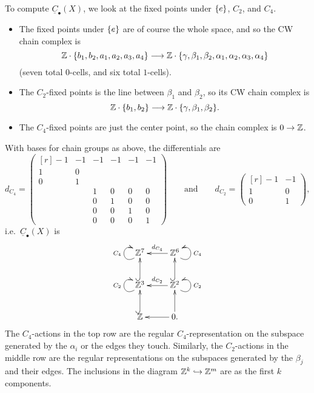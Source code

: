 \begin{exm}
To compute $\underline C_\bullet(X)$, we look at the fixed points under $\{e\}$, $C_2$, and $C_4$.
\begin{itemize}
	\item The fixed points under $\{e\}$ are of course the whole space, and so the CW chain complex is
	\[\mathbb Z\cdot\{b_1,b_2,a_1,a_2,a_3,a_4\}\longrightarrow \mathbb Z\cdot
	\{\gamma,\beta_1,\beta_2,\alpha_1,\alpha_2,\alpha_3,\alpha_4\}\]
	(seven total $0$-cells, and six total $1$-cells).
	\item The $C_2$-fixed points is the line between $\beta_1$ and $\beta_2$, so its CW chain complex is
	\[\mathbb Z\cdot\{b_1,b_2\}\longrightarrow \mathbb Z\cdot\{\gamma, \beta_1,\beta_2\}.\]
	\item The $C_4$-fixed points are just the center point, so the chain complex is $0\to\mathbb Z$.
\end{itemize}
With bases for chain groups as above, the differentials are
\[d_{C_4} = \begin{pmatrix*}[r]
	-1 & -1 & -1 & -1 & -1 & -1\\
	1 & 0\\0 & 1\\
	&& 1 & 0 & 0 & 0\\
	&&0& 1 & 0 & 0\\
	&&0&0& 1 & 0\\
	&&0&0&0& 1
\end{pmatrix*} \qquad\text{and}\qquad
d_{C_2} = \begin{pmatrix*}[r]
	-1 & -1\\
	1 & 0\\0 & 1
\end{pmatrix*},
\]
i.e.\ $\underline C_\bullet(X)$ is
\[\xymatrix{
	\ar@(dl,ul)^{C_4}\Z^7 & \Z^6\ar[l]_{d_{C_4}}\ar@(dr,ur)_{C_4}\\
	\Z^3\ar@(dl,ul)^{C_2}\ar@{^(->}[u] & \Z^2\ar@{^(->}[u]\ar[l]_{d_{C_2}}\ar@(dr,ur)_{C_2}\\
	\Z\ar@{^(->}[u] & 0.\ar[l]\ar[u]
}\]
The $C_4$-actions in the top row are the regular $C_4$-representation on the subspace generated by the $\alpha_i$
or the edges they touch. Similarly, the $C_2$-actions in the middle row are the regular representations on the
subspaces generated by the $\beta_j$ and their edges. The inclusions in the diagram $\mathbb Z^k\hookrightarrow\mathbb Z^m$ are as the first
$k$ components.


\end{exm}
